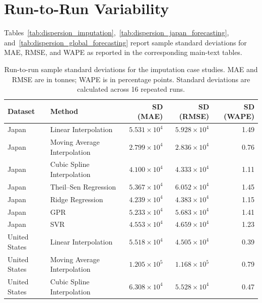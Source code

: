 \section[\appendixname~\thesection]{Run-to-Run Variability}
\label{sec:appendix_d}

Tables~\ref{tab:dispersion_imputation},~\ref{tab:dispersion_japan_forecasting}, and~\ref{tab:dispersion_global_forecasting} report sample standard deviations for MAE, RMSE, and WAPE as reported in the corresponding main-text tables.
\setcounter{table}{0}
\renewcommand{\thetable}{D\arabic{table}}

\begin{table}[!ht]
	\centering
	\caption{Run-to-run sample standard deviations for the imputation case studies. MAE and RMSE are in tonnes; WAPE is in percentage points. Standard deviations are calculated across 16 repeated runs.}
	\scriptsize
	\begin{tabular}{@{}llrrr@{}}
		\toprule
		Dataset       & Method                       & SD (MAE)                & SD (RMSE)               & SD (WAPE) \\
		\midrule
		Japan         & Linear Interpolation         & \(5.531 \times 10^{4}\) & \(5.928 \times 10^{4}\) & 1.49      \\
		Japan         & Moving Average Interpolation & \(2.799 \times 10^{4}\) & \(2.836 \times 10^{4}\) & 0.76      \\
		Japan         & Cubic Spline Interpolation   & \(4.100 \times 10^{4}\) & \(4.333 \times 10^{4}\) & 1.11      \\
		Japan         & Theil--Sen Regression        & \(5.367 \times 10^{4}\) & \(6.052 \times 10^{4}\) & 1.45      \\
		Japan         & Ridge Regression             & \(4.239 \times 10^{4}\) & \(4.383 \times 10^{4}\) & 1.15      \\
		Japan         & GPR                          & \(5.233 \times 10^{4}\) & \(5.683 \times 10^{4}\) & 1.41      \\
		Japan         & SVR                          & \(4.553 \times 10^{4}\) & \(4.659 \times 10^{4}\) & 1.23      \\
		\midrule
		United States & Linear Interpolation         & \(5.518 \times 10^{4}\) & \(4.505 \times 10^{4}\) & 0.39      \\
		United States & Moving Average Interpolation & \(1.205 \times 10^{5}\) & \(1.168 \times 10^{5}\) & 0.79      \\
		United States & Cubic Spline Interpolation   & \(6.308 \times 10^{4}\) & \(5.528 \times 10^{4}\) & 0.47      \\

\end{tabular}
\end{table}
